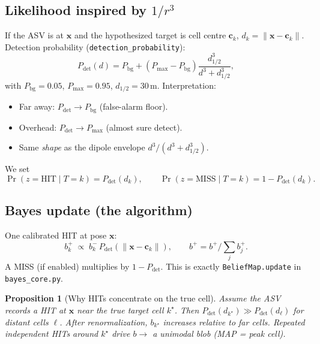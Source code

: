 \documentclass[11pt,a4paper]{article}
\newtheorem{proposition}{Proposition}
\begin{document}
\subsection{Likelihood inspired by \(1/r^{3}\)}
If the ASV is at \(\mathbf{x}\) and the hypothesized target is cell centre
\(\mathbf{c}_k\), \(d_k=\lVert\mathbf{x}-\mathbf{c}_k\rVert\). Detection
probability (\texttt{detection\_probability}):
\begin{equation}
\label{eq:pdet}
P_{\mathrm{det}}(d)
=P_{\mathrm{bg}}+(P_{\max}-P_{\mathrm{bg}})
\frac{d_{1/2}^{3}}{d^{3}+d_{1/2}^{3}},
\end{equation}
with \(P_{\mathrm{bg}}=0.05\), \(P_{\max}=0.95\), \(d_{1/2}=30\,\mathrm{m}\).
Interpretation:
\begin{itemize}[leftmargin=*]
  \item Far away: \(P_{\mathrm{det}}\to P_{\mathrm{bg}}\) (false-alarm floor).
  \item Overhead: \(P_{\mathrm{det}}\to P_{\max}\) (almost sure detect).
  \item Same \emph{shape} as the dipole envelope \(d^{3}/(d^{3}+d_{1/2}^{3})\).
\end{itemize}
We set
\[
\Pr(z=\mathrm{HIT}\mid T=k)=P_{\mathrm{det}}(d_k),\qquad
\Pr(z=\mathrm{MISS}\mid T=k)=1-P_{\mathrm{det}}(d_k).
\]

\subsection{Bayes update (the algorithm)}
One calibrated HIT at pose \(\mathbf{x}\):
\begin{equation}
\label{eq:bayes-hit}
b_k^{+}
\;\propto\;
b_k^{-}\, P_{\mathrm{det}}(\lVert\mathbf{x}-\mathbf{c}_k\rVert),
\qquad
b^{+}=b^{+}/\textstyle\sum_{j} b_{j}^{+}.
\end{equation}
A MISS (if enabled) multiplies by \(1-P_{\mathrm{det}}\). This is exactly
\texttt{BeliefMap.update} in \texttt{bayes\_core.py}.

\begin{proposition}[Why HITs concentrate on the true cell]
Assume the ASV records a HIT at \(\mathbf{x}\) near the true target cell
\(k^{\star}\). Then \(P_{\mathrm{det}}(d_{k^{\star}})\gg P_{\mathrm{det}}(d_{\ell})\)
for distant cells \(\ell\). After renormalization,
\(b_{k^{\star}}\) increases relative to far cells. Repeated independent HITs
around \(k^{\star}\) drive \(b\to\) a unimodal blob (MAP = peak cell).
\end{proposition}
\end{document}
